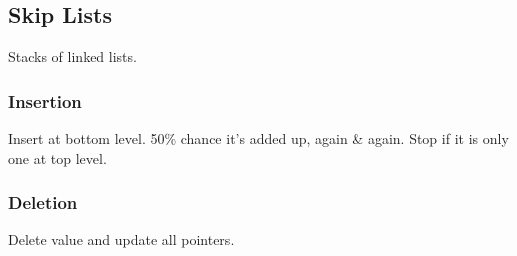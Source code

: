 \subsection*{Skip Lists}
Stacks of linked lists.
\subsubsection*{Insertion}
Insert at bottom level. 50\% chance it's added up, again \& again. Stop if it is only one at top level.
\subsubsection*{Deletion}
Delete value and update all pointers.
